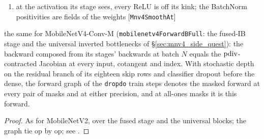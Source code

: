 \begin{theorem}
  \label{thm:mobilenetv4FullHasVJP}
  \leanok
  \Assume{}
  \begin{enumerate}
    \item at the activation its stage sees, every ReLU is off its kink; the
          BatchNorm positivities are fields of the weights
          \hfill[\texttt{Mnv4SmoothAt}]
  \end{enumerate}
  \Prove{} the same for MobileNetV4-Conv-M (\texttt{mobilenetv4ForwardBFull}:
  the fused-IB stage and the universal inverted bottlenecks of
  \S\ref{sec:mnv4_side_quest}): the backward composed from its stages'
  backwards at batch \(N\) equals the \(\operatorname{pdiv}\)-contracted Jacobian at every
  input, cotangent and index. With stochastic depth on the residual branch of
  its eighteen skip rows and classifier dropout before the dense, the forward
  graph of the \texttt{dropdo} train steps denotes the masked forward at every
  pair of masks and at either precision, and at all-ones masks it is this
  forward.
\end{theorem}

\begin{proof}
\leanok
As for MobileNetV2, over the fused stage and the universal blocks; the
graph tie op by op; see
.
\end{proof}

